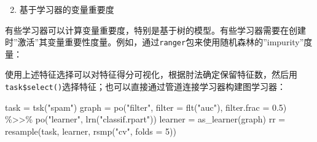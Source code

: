 \documentclass[
  11pt,
  ignorenonframetext,
  dvipsnames,UTF8]{beamer}
\newenvironment{Shaded}{\begin{snugshade}}{\end{snugshade}}
\newcommand{\AttributeTok}[1]{\textcolor[rgb]{0.77,0.63,0.00}{#1}}
\newcommand{\CommentTok}[1]{\textcolor[rgb]{0.56,0.35,0.01}{\textit{#1}}}
\newcommand{\DecValTok}[1]{\textcolor[rgb]{0.00,0.00,0.81}{#1}}
\newcommand{\FloatTok}[1]{\textcolor[rgb]{0.00,0.00,0.81}{#1}}
\newcommand{\FunctionTok}[1]{\textcolor[rgb]{0.00,0.00,0.00}{#1}}
\newcommand{\NormalTok}[1]{#1}
\newcommand{\OtherTok}[1]{\textcolor[rgb]{0.56,0.35,0.01}{#1}}
\newcommand{\SpecialCharTok}[1]{\textcolor[rgb]{0.00,0.00,0.00}{#1}}
\newcommand{\StringTok}[1]{\textcolor[rgb]{0.31,0.60,0.02}{#1}}
\providecommand{\tightlist}{%
  \setlength{\itemsep}{0pt}\setlength{\parskip}{0pt}}
\begin{document}
\begin{frame}[fragile]{}
\protect\hypertarget{section-45}{}
\begin{enumerate}
[(1)]
\setcounter{enumi}{1}
\tightlist
\item
  基于学习器的变量重要度
\end{enumerate}

有些学习器可以计算变量重要度，特别是基于树的模型。有些学习器需要在创建时''激活''其变量重要性度量。例如，通过\texttt{ranger}包来使用随机森林的''impurity''度量：

\begin{Shaded}
\end{Shaded}
\end{frame}

\begin{frame}[fragile]{}
\protect\hypertarget{section-46}{}
使用上述特征选择可以对特征得分可视化，根据肘法确定保留特征数，然后用\texttt{task\$select()}选择特征；也可以直接通过管道连接学习器构建图学习器：

\begin{Shaded}
\begin{Highlighting}[]
\NormalTok{task }\OtherTok{=} \FunctionTok{tsk}\NormalTok{(}\StringTok{"spam"}\NormalTok{)}
\NormalTok{graph }\OtherTok{=} \FunctionTok{po}\NormalTok{(}\StringTok{"filter"}\NormalTok{, }\AttributeTok{filter =} \FunctionTok{flt}\NormalTok{(}\StringTok{"auc"}\NormalTok{), }
           \AttributeTok{filter.frac =} \FloatTok{0.5}\NormalTok{) }\SpecialCharTok{\%\textgreater{}\textgreater{}\%}   
  \FunctionTok{po}\NormalTok{(}\StringTok{"learner"}\NormalTok{, }\FunctionTok{lrn}\NormalTok{(}\StringTok{"classif.rpart"}\NormalTok{))}
\NormalTok{learner }\OtherTok{=} \FunctionTok{as\_learner}\NormalTok{(graph)}
\NormalTok{rr }\OtherTok{=} \FunctionTok{resample}\NormalTok{(task, learner, }\FunctionTok{rsmp}\NormalTok{(}\StringTok{"cv"}\NormalTok{, }\AttributeTok{folds =} \DecValTok{5}\NormalTok{))}
\end{Highlighting}
\end{Shaded}
\end{frame}
\end{document}
